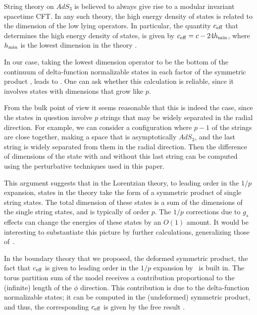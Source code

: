 \documentclass[12pt]{article}
\numberwithin{equation}{section}
\begin{document}
String theory on $AdS_3$ is believed to always give rise to a modular invariant spacetime CFT. In any such theory, the high energy density of states is related to the dimension of the low lying operators. In particular, the quantity $c_{\rm eff}$ that determines the high energy density of states, is given by 
$c_{\rm eff}=c-24 h_{\rm min}$, where $h_{\rm min}$ is the lowest dimension in the theory . 

In our case, taking the lowest dimension operator to be the bottom of the continuum of delta-function normalizable states in each factor of the symmetric product \ourcft, leads to \ceff. One can ask whether this calculation is reliable, since it involves states with dimensions that grow like $p$. 

From the bulk point of view it seems reasonable that this is indeed the case, since the states in question involve $p$ strings that may be widely separated in the radial direction. For example, we can consider a configuration where $p-1$ of the strings are close together, making a space that is asymptotically $AdS_3$, and the last string is widely separated from them in the radial direction. Then the difference of dimensions of the state with and without this last string can be computed using the perturbative techniques used in this paper. 

This argument suggests that in the Lorentzian theory, to leading order in the $1/p$ expansion, states in the theory take the form of a symmetric product of single string states.  The total dimension of these states is a sum of the dimensions of the single string states, and is typically of order $p$. The $1/p$ corrections due to $g_s$ effects can change the energies of these states by an $O(1)$ amount. It would be interesting to substantiate this picture by further calculations, generalizing those of~.  
 
In the boundary theory that we proposed, the deformed symmetric product, the fact that $c_{\rm eff}$ is given to leading order in the $1/p$ expansion by \ceff\ is built in. The torus partition sum of the model receives a contribution proportional to the (infinite) length of the $\phi$ direction. This contribution is due to the delta-function normalizable states; it can be computed in the (undeformed) symmetric product, and thus, the corresponding $c_{\rm eff}$ is given by the free result \ceff. 



\end{document}
